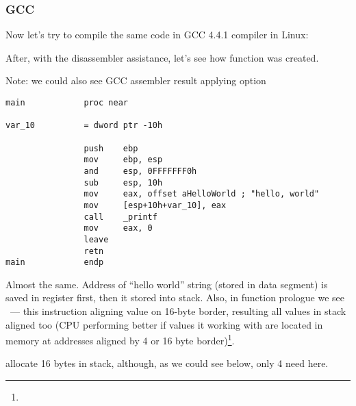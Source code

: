 \subsubsection{GCC}

{Now let's try to compile the same \CCpp code in GCC 4.4.1 compiler in Linux}: 

{After, with the \IDA disassembler assistance, let's see how \main function was created.} 

{Note: we could also see GCC assembler result applying option} 

\begin{lstlisting}[caption=GCC]
main            proc near

var_10          = dword ptr -10h

                push    ebp
                mov     ebp, esp
                and     esp, 0FFFFFFF0h
                sub     esp, 10h
                mov     eax, offset aHelloWorld ; "hello, world"
                mov     [esp+10h+var_10], eax
                call    _printf
                mov     eax, 0
                leave
                retn
main            endp
\end{lstlisting}

{Almost the same.
Address of ``hello world'' string (stored in data segment) is saved in \EAX register first, then it stored into stack.
Also, in function prologue we see  ~--- 
this instruction aligning \ESP value on 16-byte border, resulting all values in stack aligned too
(CPU performing better if values it working with are located in memory at addresses aligned by 
4 or 16 byte border)\footnote{\URLWPDA}.}

 
{allocate 16 bytes in stack, although, as we could see below, only 4 need here.} 

